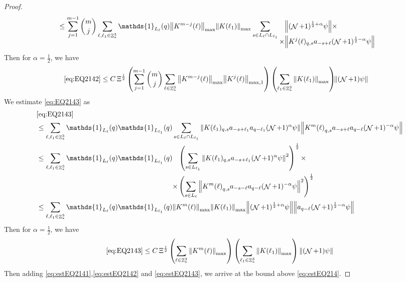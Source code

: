 \documentclass[sn-mathphys, Numbered ,a4paper]{sn-jnl}%
\DeclareMathOperator{\Z}{\mathbb{Z}}
\DeclareMathOperator{\NN}{\mathcal{N}}
\newcommand{\half}{\frac{1}{2}}
\theoremstyle{plain}
\theoremstyle{definition}
\theoremstyle{remark}
\theoremstyle{plain}
\theoremstyle{definition}
\theoremstyle{remark}
\begin{document}
\begin{proof}
\begin{align}
		&\leq \sum\limits_{j=1}^{m-1} {{m}\choose j} \sum\limits_{\ell, \ell_1\in \Z^3_*} \mathds{1}_{L_{\ell}}(q) \norm{K^{m-j}(\ell)}_{\mathrm{max}} \norm{K(\ell_1)}_{\mathrm{max}}  \sum\limits_{s\in L_{\ell} \cap L_{\ell_1}} \begin{aligned}[t] &\norm{(\NN+1)^{\half+\alpha}\psi}\nonumber \times \\ \times&\norm{ K^j(\ell)_{q,s} a_{-s+\ell} (\NN+1)^{\half-\alpha} \psi }\end{aligned} \nonumber
	\end{align} 
	Then for $\alpha = \half$, we have
	\begin{align}
		\eqref{eq:EQ2142} &\leq  C \, \Xi^\half \left(  \sum\limits_{j=1}^{m-1} {{m}\choose j} \sum\limits_{\ell \in \Z^3_*} \norm{K^{m-j}(\ell)}_{\mathrm{max}} \norm{ K^{j}(\ell)}_{\mathrm{max,1}}\right) \left( \sum\limits_{ \ell_1\in \Z^3_*}\norm{ K(\ell_1) }_{\mathrm{max}} \right)\!\! \norm{(\NN+1) \psi }\label{eq:estEQ2142}
	\end{align}
	We estimate \eqref{eq:EQ2143} as 
	\begin{align}
		&\eqref{eq:EQ2143}\nonumber\\
		&\leq \sum\limits_{\ell, \ell_1\in \Z^3_*} \mathds{1}_{L_{\ell}}(q) \mathds{1}_{L_{\ell_1}}(q) \sum\limits_{ s \in L_{\ell} \cap L_{\ell_1}} \norm{K(\ell_1)_{q,s} a_{-s+\ell_1} a_{q-\ell_1}  (\NN+1)^{\alpha}\psi}\norm{ K^m{(\ell)}_{q,s}  a_{-s+\ell} a_{q-\ell} (\NN+1)^{-\alpha} \psi } \nonumber\\
		&\leq \sum\limits_{\ell, \ell_1\in \Z^3_*} \mathds{1}_{L_{\ell}}(q) \mathds{1}_{L_{\ell_1}}(q) \begin{aligned}[t]&\left(\sum\limits_{ s \in L_{\ell_1}} \norm{K(\ell_1)_{q,s} a_{-s+\ell_1} (\NN+1)^{\alpha}\psi}^2\right)^\half \times \nonumber\\ \times &\left( \sum\limits_{ s \in L_{\ell} } \norm{ K^m{(\ell)}_{q,s}  a_{-s-\ell} a_{q-\ell} (\NN+1)^{-\alpha} \psi }^2\right)^\half \end{aligned}\nonumber\\
		&\leq \sum\limits_{\ell, \ell_1\in \Z^3_*} \mathds{1}_{L_{\ell}}(q) \mathds{1}_{L_{\ell_1}}(q) \norm{K^m{(\ell)}}_{\mathrm{max}} \norm{K(\ell_1)}_{\mathrm{max}} \norm{   (\NN+1)^{\half+\alpha}\psi} \norm{ a_{q-\ell} (\NN+1)^{\half-\alpha} \psi } \nonumber
	\end{align} 
	Then for $\alpha = \half$, we have
	\begin{equation}
		\eqref{eq:EQ2143}\leq C\, \Xi^\half \left(\sum\limits_{\ell\in \Z^3_*} \norm{K^m(\ell)}_{\mathrm{max}}\right)\left(  \sum\limits_{ \ell_1\in \Z^3_*}  \norm{ K(\ell_1)}_{\mathrm{max}} \right) \norm{ (\NN+1) \psi}\label{eq:estEQ2143} 
	\end{equation}
	Then adding \eqref{eq:estEQ2141},\eqref{eq:estEQ2142} and \eqref{eq:estEQ2143}, we arrive at the bound above \eqref{eq:estEQ214}.
\end{proof}
\end{document}
